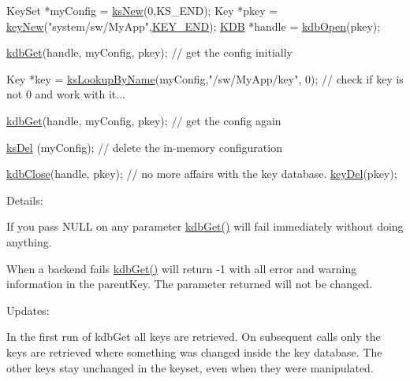 \begin{DoxyCode}
KeySet *myConfig = \hyperlink{group__keyset_ga671e1aaee3ae9dc13b4834a4ddbd2c3c}{ksNew}(0,KS\_END);
Key *pkey = \hyperlink{group__key_gad23c65b44bf48d773759e1f9a4d43b89}{keyNew}(\textcolor{stringliteral}{"system/sw/MyApp"},\hyperlink{group__key_gga91fb3178848bd682000958089abbaf40aa8adb6fcb92dec58fb19410eacfdd403}{KEY\_END});
\hyperlink{classkdb_1_1KDB_a7e0637995ce9f294cdbc6f167df6db40}{KDB} *handle = \hyperlink{group__kdb_ga6808defe5870f328dd17910aacbdc6ca}{kdbOpen}(pkey);

\hyperlink{group__kdb_ga28e385fd9cb7ccfe0b2f1ed2f62453a1}{kdbGet}(handle, myConfig, pkey); \textcolor{comment}{// get the config initially}

Key *key = \hyperlink{group__keyset_gad2e30fb6d4739d917c5abb2ac2f9c1a1}{ksLookupByName}(myConfig,\textcolor{stringliteral}{"/sw/MyApp/key"}, 0);
\textcolor{comment}{// check if key is not 0 and work with it...}

\hyperlink{group__kdb_ga28e385fd9cb7ccfe0b2f1ed2f62453a1}{kdbGet}(handle, myConfig, pkey); \textcolor{comment}{// get the config again}

\hyperlink{group__keyset_ga27e5c16473b02a422238c8d970db7ac8}{ksDel} (myConfig); \textcolor{comment}{// delete the in-memory configuration}

\hyperlink{group__kdb_gadb54dc9fda17ee07deb9444df745c96f}{kdbClose}(handle, pkey); \textcolor{comment}{// no more affairs with the key database.}
\hyperlink{group__key_ga3df95bbc2494e3e6703ece5639be5bb1}{keyDel}(pkey);
\end{DoxyCode}


\begin{DoxyParagraph}{Details\-:}

\end{DoxyParagraph}
If you pass N\-U\-L\-L on any parameter \hyperlink{group__kdb_ga28e385fd9cb7ccfe0b2f1ed2f62453a1}{kdb\-Get()} will fail immediately without doing anything.

When a backend fails \hyperlink{group__kdb_ga28e385fd9cb7ccfe0b2f1ed2f62453a1}{kdb\-Get()} will return -\/1 with all error and warning information in the {\ttfamily parent\-Key}. The parameter {\ttfamily returned} will not be changed.

\begin{DoxyParagraph}{Updates\-:}

\end{DoxyParagraph}
In the first run of kdb\-Get all keys are retrieved. On subsequent calls only the keys are retrieved where something was changed inside the key database. The other keys stay unchanged in the keyset, even when they were manipulated.

